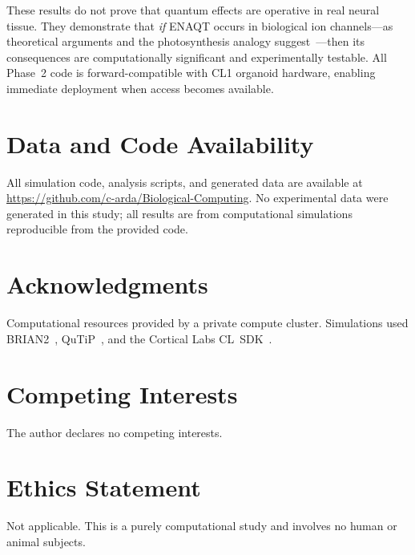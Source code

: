\documentclass[twocolumn,11pt]{article}
\begin{document}
These results do not prove that quantum effects are operative
in real neural tissue.  They demonstrate that \emph{if} ENAQT
occurs in biological ion channels---as theoretical arguments
and the photosynthesis analogy
suggest~\cite{Mohseni2008,Plenio2008,Rebentrost2009}---then
its consequences are computationally significant and
experimentally testable.  All Phase~2 code is
forward-compatible with CL1 organoid hardware, enabling
immediate deployment when access becomes available.

\section*{Data and Code Availability}
All simulation code, analysis scripts, and generated data are
available at
\url{https://github.com/c-arda/Biological-Computing}.
No experimental data were generated in this study; all results
are from computational simulations reproducible from the
provided code.

\section*{Acknowledgments}
Computational resources provided by a private compute cluster.
Simulations used BRIAN2~\cite{Stimberg2019},
QuTiP~\cite{Johansson2012,Johansson2013}, and the
Cortical Labs CL~SDK~\cite{CLSDK2024}.

\section*{Competing Interests}
The author declares no competing interests.

\section*{Ethics Statement}
Not applicable.  This is a purely computational study and
involves no human or animal subjects.



\end{document}
